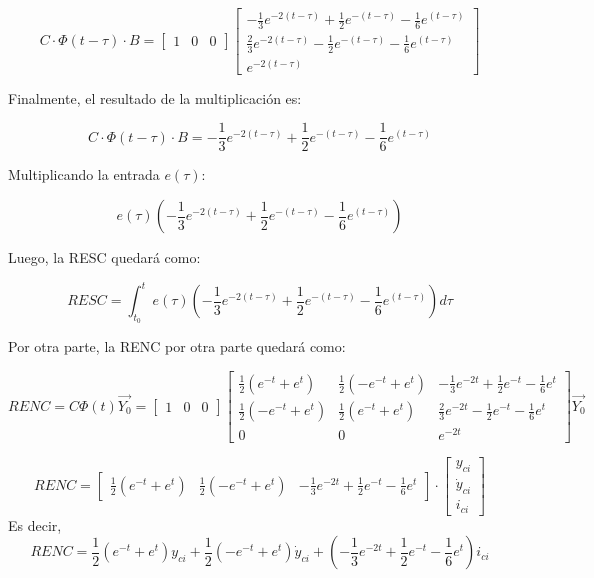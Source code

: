 \begin{enumerate}
\[
C \cdot \Phi(t - \tau) \cdot B =
\begin{bmatrix}
1 & 0 & 0
\end{bmatrix}
\begin{bmatrix}
-\frac{1}{3}e^{-2(t-\tau)} + \frac{1}{2}e^{-(t-\tau)} - \frac{1}{6}e^{(t-\tau)} \\
\frac{2}{3}e^{-2(t-\tau)} - \frac{1}{2}e^{-(t-\tau)} - \frac{1}{6}e^{(t-\tau)} \\
e^{-2(t-\tau)}
\end{bmatrix}
\]

Finalmente, el resultado de la multiplicación es:

\[
C \cdot \Phi(t - \tau) \cdot B = -\frac{1}{3}e^{-2(t-\tau)} + \frac{1}{2}e^{-(t-\tau)} - \frac{1}{6}e^{(t-\tau)}
\]

Multiplicando la entrada $e(\tau)$:

\[
 e(\tau) \left( -\frac{1}{3}e^{-2(t-\tau)} + \frac{1}{2}e^{-(t-\tau)} - \frac{1}{6}e^{(t-\tau)} \right)
\]

Luego, la RESC quedará como:

\[ RESC = \int_{t_0}^{t}
 e(\tau) \left( -\frac{1}{3}e^{-2(t-\tau)} + \frac{1}{2}e^{-(t-\tau)} - \frac{1}{6}e^{(t-\tau)} \right) d\tau
\]

Por otra parte, la RENC por otra parte quedará como:

\[ RENC = C \Phi(t) \Vec{Y_0} = \begin{bmatrix} 1 & 0 & 0 \end{bmatrix}
\begin{bmatrix}
\frac{1}{2} (e^{-t} + e^{t}) & \frac{1}{2} (-e^{-t} + e^{t}) & -\frac{1}{3}e^{-2t}+\frac{1}{2}e^{-t}-\frac{1}{6} e^{t} \\
\frac{1}{2} (-e^{-t} + e^{t}) & \frac{1}{2} (e^{-t} + e^{t}) &\frac{2}{3}e^{-2t}-\frac{1}{2}e^{-t}-\frac{1}{6} e^{t} \\
0 & 0 & e^{-2t} 
\end{bmatrix} \Vec{Y_0}
\]

\[ RENC = \begin{bmatrix} \frac{1}{2} (e^{-t} + e^{t}) & \frac{1}{2} (-e^{-t} + e^{t}) & -\frac{1}{3}e^{-2t}+\frac{1}{2}e^{-t}-\frac{1}{6} e^{t} \end{bmatrix} \cdot \begin{bmatrix}
y_{ci} \\
\dot{y}_{ci} \\
i_{ci}
\end{bmatrix} 
\]
Es decir,
\[
RENC = \frac{1}{2} (e^{-t} + e^{t}) y_{ci} + \frac{1}{2} (-e^{-t} + e^{t}) \dot{y}_{ci} + \left( -\frac{1}{3}e^{-2t} + \frac{1}{2}e^{-t} - \frac{1}{6} e^{t} \right) i_{ci}
\]


\end{enumerate}
